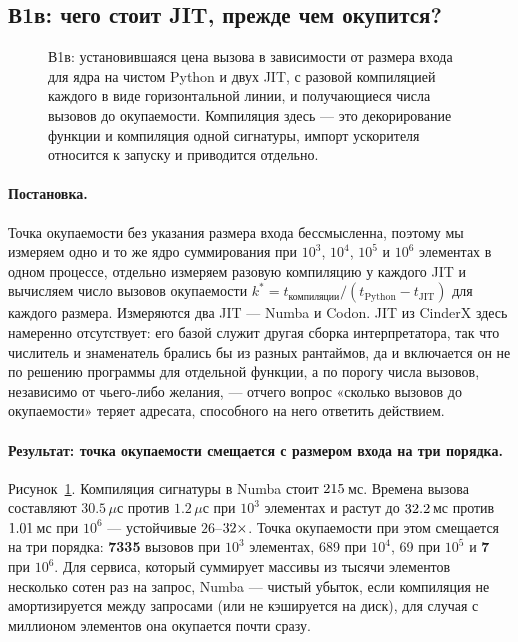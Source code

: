 \subsection{В1в: чего стоит JIT, прежде чем окупится?}
\label{sec:rq1c}

\begin{figure}[t]
  \centering
  \caption{В1в: установившаяся цена вызова в зависимости от размера входа для ядра на чистом
    Python и двух JIT, с разовой компиляцией каждого в виде горизонтальной линии, и получающиеся
    числа вызовов до окупаемости. Компиляция здесь --- это декорирование функции и компиляция
    одной сигнатуры, импорт ускорителя относится к запуску и приводится отдельно.}
  \label{fig:breakeven}
\end{figure}

\paragraph{Постановка.} Точка окупаемости без указания размера входа бессмысленна, поэтому мы
измеряем одно и то же ядро суммирования при $10^3$, $10^4$, $10^5$ и $10^6$ элементах в одном
процессе, отдельно измеряем разовую компиляцию у каждого JIT и вычисляем число вызовов
окупаемости $k^{*} = t_{\text{компиляции}} / (t_{\text{Python}} - t_{\text{JIT}})$ для каждого
размера. Измеряются два JIT --- Numba и Codon. JIT из CinderX здесь намеренно отсутствует: его
базой служит другая сборка интерпретатора, так что числитель и знаменатель брались бы из разных
рантаймов, да и включается он не по решению программы для отдельной функции, а по порогу числа
вызовов, независимо от чьего-либо желания, --- отчего вопрос «сколько вызовов до окупаемости»
теряет адресата, способного на него ответить действием.

\paragraph{Результат: точка окупаемости смещается с размером входа на три порядка.}
Рисунок~\ref{fig:breakeven}. Компиляция сигнатуры в Numba стоит $\meas{fact:b1_breakeven-314:facts.numba_compile_s:ms}{215}$\,мс.
Времена вызова составляют $30.5\,\mu$с против $1.2\,\mu$с при $10^3$ элементах и растут до
$\meas{med:b1_breakeven-314:arraysum_n1000000/cpython_loop:ms}{32.2}$\,мс против $\meas{med:b1_breakeven-314:arraysum_n1000000/numba:ms}{1.01}$\,мс при $10^6$ --- устойчивые $26$--$\meas{ratio:b1_breakeven-314:arraysum_n1000000/cpython_loop|b1_breakeven-314:arraysum_n1000000/numba}{32}\times$. Точка окупаемости при этом
смещается на три порядка: \textbf{7335} вызовов при $10^3$ элементах, 689 при $10^4$, 69 при
$10^5$ и \textbf{7} при $10^6$. Для сервиса, который суммирует массивы из тысячи элементов несколько
сотен раз на запрос, Numba --- чистый убыток, если компиляция не амортизируется между запросами
(или не кэшируется на диск), для случая с миллионом элементов она окупается почти сразу.

